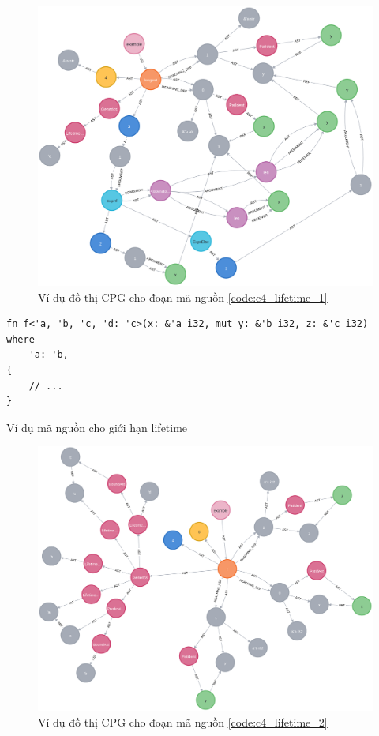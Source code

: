 \begin{figure}[H]
    \includegraphics[width=1\columnwidth]{figures/c4/c4_lifetime_1.png}
    \centering
    \caption{Ví dụ đồ thị CPG cho đoạn mã nguồn \ref{code:c4_lifetime_1}}
    \label{img:c4_lifetime_1}
\end{figure}

\begin{listing}[H]
\begin{verbatim}
fn f<'a, 'b, 'c, 'd: 'c>(x: &'a i32, mut y: &'b i32, z: &'c i32)
where
    'a: 'b,
{
    // ...
}
\end{verbatim}
\caption{Ví dụ mã nguồn cho giới hạn lifetime}
\label{code:c4_lifetime_2}
\end{listing}

\begin{figure}[H]
    \includegraphics[width=1\columnwidth]{figures/c4/c4_lifetime_2.png}
    \centering
    \caption{Ví dụ đồ thị CPG cho đoạn mã nguồn \ref{code:c4_lifetime_2}}
    \label{img:c4_lifetime_2}
\end{figure}
